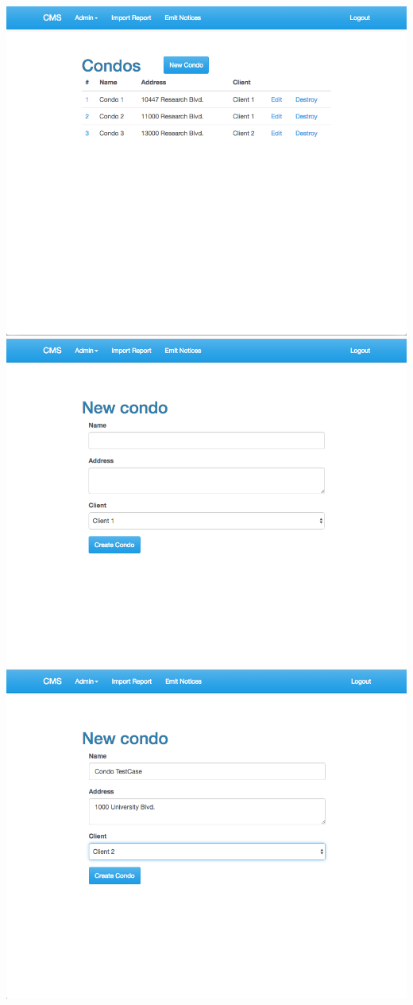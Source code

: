 \begin{itemize}
    \includegraphics[scale=0.25]{./images/ss/condo/create/2.png}\\
    \includegraphics[scale=0.25]{./images/ss/condo/create/3.png}
    \includegraphics[scale=0.25]{./images/ss/condo/create/4.png}\\

\end{itemize}
